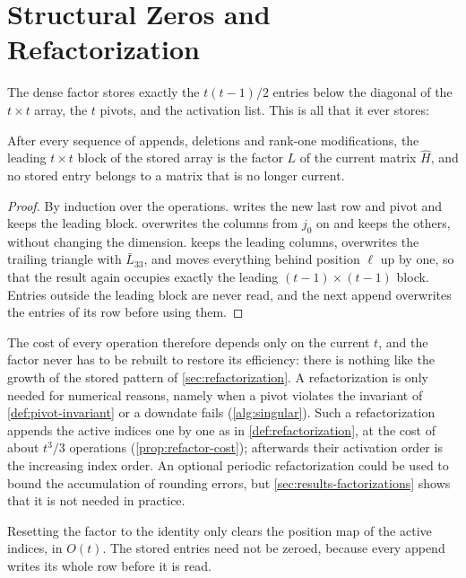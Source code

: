 \section{Structural Zeros and Refactorization}
\label{sec:dense-no-zeros}

The dense factor stores exactly the $t(t-1)/2$ entries below the diagonal of the $t\times t$
array, the $t$ pivots, and the activation list. This is all that it ever stores:

\begin{prop} \label{prop:no-zeros}
After every sequence of appends, deletions and rank-one modifications, the leading
$t\times t$ block of the stored array is the factor $L$ of the current matrix $\hat H$, and no
stored entry belongs to a matrix that is no longer current.
\end{prop}

\begin{proof}
By induction over the operations.  writes the new last row and pivot and keeps
the leading block.  overwrites the columns from $j_0$ on and keeps the
others, without changing the dimension.  keeps the leading columns, overwrites
the trailing triangle with $\bar L_{33}$, and moves everything behind position $\ell$ up by one,
so that the result again occupies exactly the leading $(t-1)\times(t-1)$ block. Entries outside
the leading block are never read, and the next append overwrites the entries of its row before
using them.
\end{proof}

The cost of every operation therefore depends only on the current $t$, and the factor never has
to be rebuilt to restore its efficiency: there is nothing like the growth of the stored pattern
of \cref{sec:refactorization}. A refactorization is only needed for numerical reasons, namely
when a pivot violates the invariant of \cref{def:pivot-invariant} or a downdate fails
(\cref{alg:singular}). Such a refactorization appends the active indices one by one as in
\cref{def:refactorization}, at the cost of about $t^3/3$ operations
(\cref{prop:refactor-cost}); afterwards their activation order is the increasing index order. An
optional periodic refactorization could be used to bound the accumulation of rounding errors,
but \cref{sec:results-factorizations} shows that it is not needed in practice.

\begin{remark}[Reset] \label{rem:dense-reset}
Resetting the factor to the identity only clears the position map of the active indices, in
$O(t)$. The stored entries need not be zeroed, because every append writes its whole row before
it is read.
\end{remark}


